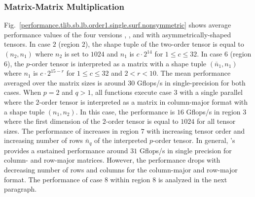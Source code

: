 

\subsubsection{Matrix-Matrix Multiplication}
Fig.~\ref{performance.tlib.sb.lb.order1.single.surf.nonsymmetric} shows average performance values of the four versions , ,  and  with asymmetrically-shaped tensors.
In case $2$ (region $2$), the shape tuple of the two-order tensor is equal to $(n_2,n_1)$ where $n_2$ is set to $1024$ and $n_1$ is $c \cdot 2^{14}$ for $1 \leq c \leq 32$. %
In case $6$ (region $6$), the $p$-order tensor is interpreted as a matrix with a shape tuple $(\bar{n}_1,n_1)$ where $n_1$ is $c \cdot 2^{15-r}$ for $1 \leq c \leq 32$ and $2 < r < 10$.
The mean performance averaged over the matrix sizes is around $30$ Gflops/s in single-precision for both cases.
When $p=2$ and $q>1$, all functions execute case $3$ with a single parallel  where the $2$-order tensor is interpreted as a matrix in column-major format with a shape tuple $(n_1,n_2)$.
In this case, the performance is $16$ Gflops/s in region $3$ where the first dimension of the $2$-order tensor is equal to $1024$ for all tensor sizes.
The performance of  increases in region $7$ with increasing tensor order and increasing number of rows $\bar{n}_q$ of the interpreted $p$-order tensor.
In general, 's  provides a sustained performance around $31$ Gflops/s in single precision for column- and row-major matrices.
However, the performance drops with decreasing number of rows and columns for the column-major and row-major format.
The performance of case $8$ within region $8$ is analyzed in the next paragraph.


